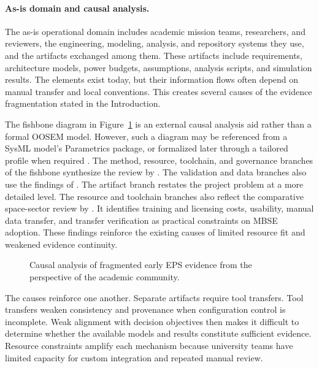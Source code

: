 \documentclass[11pt,a4paper]{article}
\begin{document}
\paragraph{As-is domain and causal analysis.}
The as-is operational domain includes academic mission teams, researchers, and reviewers, the engineering, modeling, analysis, and repository systems they use, and the artifacts exchanged among them. These artifacts include requirements, architecture models, power budgets, assumptions, analysis scripts, and simulation results. The elements exist today, but their information flows often depend on manual transfer and local conventions. This creates several causes of the evidence fragmentation stated in the Introduction.

The fishbone diagram in Figure~\ref{fig:stakeholder-causal-analysis} is an external causal analysis aid rather than a formal OOSEM model. However, such a diagram may be referenced from a SysML model's Parametrics package, or formalized later through a tailored profile when required \citep[Sec.~17.3.2]{friedenthal2014practical}. The method, resource, toolchain, and governance branches of the fishbone synthesize the review by \citet{buruso2026modelbased}. The validation and data branches also use the findings of \citet{rostamnia2026digitaltwin}. The artifact branch restates the project problem at a more detailed level. The resource and toolchain branches also reflect the comparative space-sector review by \citet{rojasramirez2022comparative}. It identifies training and licensing costs, usability, manual data transfer, and transfer verification as practical constraints on MBSE adoption. These findings reinforce the existing causes of limited resource fit and weakened evidence continuity.

\begin{figure}[htbp]
    \centering
    \resizebox{\linewidth}{!}{}
    \caption{Causal analysis of fragmented early EPS evidence from the perspective of the academic community.}
    \label{fig:stakeholder-causal-analysis}
\end{figure}

The causes reinforce one another. Separate artifacts require tool transfers. Tool transfers weaken consistency and provenance when configuration control is incomplete. Weak alignment with decision objectives then makes it difficult to determine whether the available models and results constitute sufficient evidence. Resource constraints amplify each mechanism because university teams have limited capacity for custom integration and repeated manual review.
\end{document}
